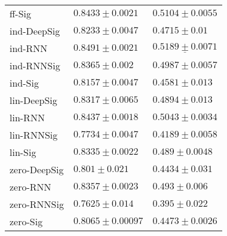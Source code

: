 \begin{tabular}{lll}
ff-Sig         &                           $ 0.8433 \pm 0.0021 $ &                           $ 0.5104 \pm 0.0055 $ \\
ind-DeepSig    &                           $ 0.8233 \pm 0.0047 $ &                             $ 0.4715 \pm 0.01 $ \\
ind-RNN        &               $  \mathbf{ 0.8491 \pm 0.0021 } $ &            $  \underline{ 0.5189 \pm 0.0071 } $ \\
ind-RNNSig     &                            $ 0.8365 \pm 0.002 $ &                           $ 0.4987 \pm 0.0057 $ \\
ind-Sig        &                           $ 0.8157 \pm 0.0047 $ &                            $ 0.4581 \pm 0.013 $ \\
lin-DeepSig    &                           $ 0.8317 \pm 0.0065 $ &                            $ 0.4894 \pm 0.013 $ \\
lin-RNN        &                           $ 0.8437 \pm 0.0018 $ &                           $ 0.5043 \pm 0.0034 $ \\
lin-RNNSig     &                           $ 0.7734 \pm 0.0047 $ &                           $ 0.4189 \pm 0.0058 $ \\
lin-Sig        &                           $ 0.8335 \pm 0.0022 $ &                            $ 0.489 \pm 0.0048 $ \\
zero-DeepSig   &                             $ 0.801 \pm 0.021 $ &                            $ 0.4434 \pm 0.031 $ \\
zero-RNN       &                           $ 0.8357 \pm 0.0023 $ &                             $ 0.493 \pm 0.006 $ \\
zero-RNNSig    &                            $ 0.7625 \pm 0.014 $ &                             $ 0.395 \pm 0.022 $ \\
zero-Sig       &                          $ 0.8065 \pm 0.00097 $ &                           $ 0.4473 \pm 0.0026 $ \\
\bottomrule
\end{tabular}
